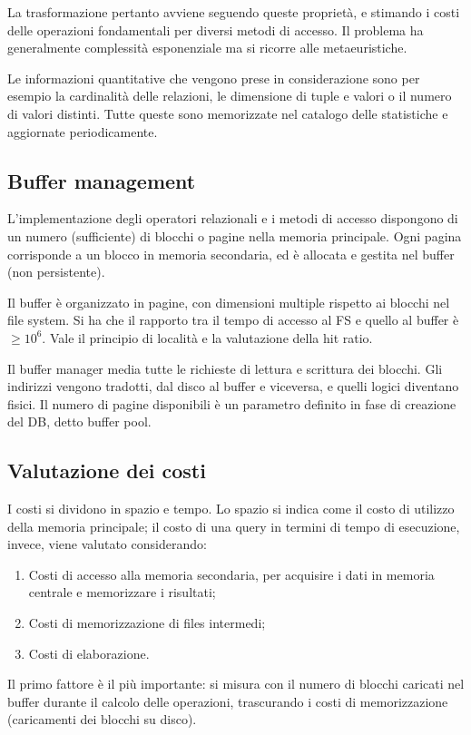 La trasformazione pertanto avviene seguendo queste proprietà, e stimando i costi delle operazioni fondamentali per diversi metodi di accesso. Il problema ha generalmente complessità esponenziale ma si ricorre alle metaeuristiche. 

Le informazioni quantitative che vengono prese in considerazione sono per esempio la cardinalità delle relazioni, le dimensione di tuple e valori o il numero di valori distinti. Tutte queste sono memorizzate nel catalogo delle statistiche e aggiornate periodicamente. 

\subsection{Buffer management}
L'implementazione degli operatori relazionali e i metodi di accesso dispongono di un numero (sufficiente) di blocchi o pagine nella memoria principale. Ogni pagina corrisponde a un blocco in memoria secondaria, ed è allocata e gestita nel buffer (non persistente).

Il buffer è organizzato in pagine, con dimensioni multiple rispetto ai blocchi nel file system. Si ha che il rapporto tra il tempo di accesso al FS e quello al buffer è $\geq 10^6$. Vale il principio di località e la valutazione della hit ratio.

Il buffer manager media tutte le richieste di lettura e scrittura dei blocchi. Gli indirizzi vengono tradotti, dal disco al buffer e viceversa, e quelli logici diventano fisici. Il numero di pagine disponibili è un parametro definito in fase di creazione del DB, detto buffer pool.

\subsection{Valutazione dei costi}
I costi si dividono in spazio e tempo. Lo spazio si indica come il costo di utilizzo della memoria principale; il costo di una query in termini di tempo di esecuzione, invece, viene valutato considerando:
\begin{enumerate}
	\item Costi di accesso alla memoria secondaria, per acquisire i dati in memoria centrale e memorizzare i risultati;
	\item Costi di memorizzazione di files intermedi;
	\item Costi di elaborazione.
\end{enumerate}
Il primo fattore è il più importante: si misura con il numero di blocchi caricati nel buffer durante il calcolo delle operazioni, trascurando i costi di memorizzazione (caricamenti dei blocchi su disco).

